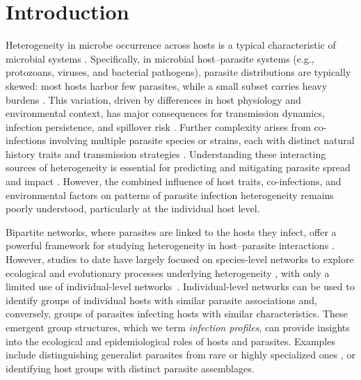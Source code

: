 \documentclass[oneside, a4paper, onecolumn, 11pt]{article}
\begin{document}
\clearpage

\section*{Introduction}
Heterogeneity in microbe occurrence across hosts is a typical characteristic of microbial systems \citep{Zaoli2021-xm,Zhang2014-ab}. Specifically, in microbial host–parasite systems (e.g., protozoans, viruses, and bacterial pathogens), parasite distributions are typically skewed: most hosts harbor few parasites, while a small subset carries heavy burdens \citep{Poulin2007-oi, Tompkins2011-ir, Zhang2014-ab}. This variation, driven by differences in host physiology and environmental context, has major consequences for transmission dynamics, infection persistence, and spillover risk \citep{VanderWaal2016-be, Paull2012-lw, Trauer2019-ab, Gomes2022-ho, Stewart-Merrill2021-xs}. Further complexity arises from co-infections involving multiple parasite species or strains, each with distinct natural history traits and transmission strategies \citep{Sherry2024-ue, Pedersen2007-mv, Venter2022-gu}. Understanding these interacting sources of heterogeneity is essential for predicting and mitigating parasite spread and impact \citep{Johnson2015-iw}. However, the combined influence of host traits, co-infections, and environmental factors on patterns of parasite infection heterogeneity remains poorly understood, particularly at the individual host level.

Bipartite networks, where parasites are linked to the hosts they infect, offer a powerful framework for studying heterogeneity in host–parasite interactions \citep{Runghen2021-hp}. However, studies to date have largely focused on species-level networks to explore ecological and evolutionary processes underlying heterogeneity \citep{Bordes2015-wt, Dallas2021-ua, Lima2012-am,Dallas2019-tx}, with only a limited use of individual-level networks~\citep{Pilosof2015-rw}. Individual-level networks can be used to identify groups of individual hosts with similar parasite associations and, conversely, groups of parasites infecting hosts with similar characteristics. These emergent group structures, which we term \textit{infection profiles}, can provide insights into the ecological and epidemiological roles of hosts and parasites. Examples include distinguishing generalist parasites from rare or highly specialized ones \citep{Poulin2011-wb}, or identifying host groups with distinct parasite assemblages.
\end{document}
